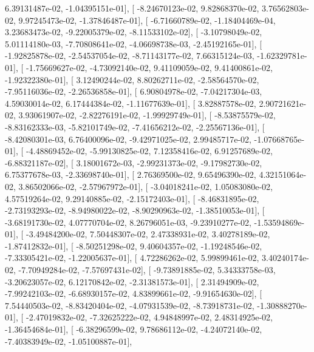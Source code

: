 \documentclass{article}
\begin{document}
          6.39131487e-02,  -1.04395151e-01],
       [ -8.24670123e-02,   9.82868370e-02,   3.76562803e-02,
          9.97245473e-02,  -1.37846487e-01],
       [ -6.71660789e-02,  -1.18404469e-04,   3.23683473e-02,
         -9.22005379e-02,  -8.11533102e-02],
       [ -3.10798049e-02,   5.01114180e-03,  -7.70808641e-02,
         -4.06698738e-03,  -2.45192165e-01],
       [ -1.92825878e-02,  -2.54537054e-02,  -8.71143177e-02,
          7.66315124e-03,  -1.62329781e-01],
       [ -1.75669627e-02,  -4.73092140e-02,   9.41109059e-02,
          9.41400861e-02,  -1.92322380e-01],
       [  3.12490244e-02,   8.80262711e-02,  -2.58564570e-02,
         -7.95116036e-02,  -2.26536858e-01],
       [  6.90804978e-02,  -7.04217304e-03,   4.59030014e-02,
          6.17444384e-02,  -1.11677639e-01],
       [  3.82887578e-02,   2.90721621e-02,   3.93061907e-02,
         -2.82276191e-02,  -1.99929749e-01],
       [ -8.53875579e-02,  -8.83162333e-03,  -5.82101749e-02,
         -7.41656212e-02,  -2.25567136e-01],
       [ -8.42080301e-03,   6.76400096e-02,  -9.42971025e-02,
          2.99485717e-02,  -1.07668765e-01],
       [ -4.48869452e-02,  -5.99130825e-02,   7.12358416e-02,
          6.91257689e-02,  -6.88321187e-02],
       [  3.18001672e-03,  -2.99231373e-02,  -9.17982730e-02,
          6.75377678e-03,  -2.33698740e-01],
       [  2.76369500e-02,   9.65496390e-02,   4.32151064e-02,
          3.86502066e-02,  -2.57967972e-01],
       [ -3.04018241e-02,   1.05083080e-02,   4.57519264e-02,
          9.29140885e-02,  -2.15172403e-01],
       [ -8.46831895e-02,  -2.73193293e-02,  -8.94980022e-02,
         -8.90290963e-02,  -1.38510053e-01],
       [ -3.68191730e-02,   4.07770704e-02,   8.26796051e-03,
         -9.23910277e-02,  -1.53594869e-01],
       [ -3.49484200e-02,   7.50448307e-02,   2.47338931e-02,
          3.40278189e-02,  -1.87412832e-01],
       [ -8.50251298e-02,   9.40604357e-02,  -1.19248546e-02,
         -7.33305421e-02,  -1.22005637e-01],
       [  4.72286262e-02,   5.99899461e-02,   3.40240174e-02,
         -7.70949284e-02,  -7.57697431e-02],
       [ -9.73891885e-02,   5.34333758e-03,  -3.20623057e-02,
          6.12170842e-02,  -2.31381573e-01],
       [  2.31494909e-02,  -7.99242103e-02,  -6.68930157e-02,
          4.83899661e-02,  -9.91654630e-02],
       [  7.54440503e-02,  -8.83420404e-02,  -4.07931539e-02,
         -8.73918731e-02,  -1.30888270e-01],
       [ -2.47019832e-02,  -7.32625222e-02,   4.94848997e-02,
          2.48314925e-02,  -1.36454684e-01],
       [ -6.38296599e-02,   9.78686112e-02,  -4.24072140e-02,
         -7.40383949e-02,  -1.05100887e-01],
\end{document}
